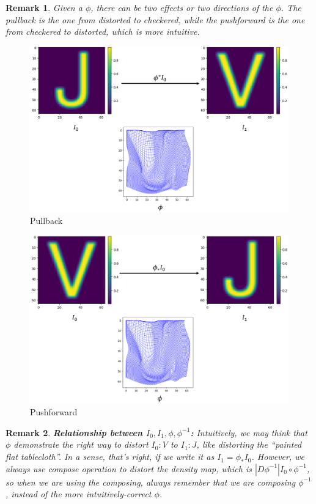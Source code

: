 \documentclass[a4paper]{article}
\theoremstyle{definition}
\theoremstyle{plain}
\newtheorem{remark}{Remark}
\begin{document}
\begin{remark}
Given a $\phi$, there can be two effects or two directions of the $\phi$. The pullback is the one from distorted to checkered, while the pushforward is the one from checkered to distorted, which is more intuitive.
\end{remark}

\begin{figure}[H]
\centering
\includegraphics[scale=0.15]{figure/pullbackphi.png}
\caption{Pullback}
\end{figure}

\begin{figure}[H]
\centering
\includegraphics[scale=0.15]{figure/pushforwardphi.png}
\caption{Pushforward}
\end{figure}

\begin{remark}
\textbf{Relationship between $I_0, I_1, \phi, \phi^{-1}$:}
Intuitively, we may think that $\phi$ demonstrate the right way to distort $I_0:V$ to $I_1:J$, like distorting the ``painted flat tablecloth''. In a sense, that's right, if we write it as $I_1=\phi_*I_0$. However, we always use compose operation to distort the density map, which is $|D\phi^{-1}|I_0\circ\phi^{-1}$, so when we are using the composing, always remember that we are composing $\phi^{-1}$, instead of the more intuitively-correct $\phi$.
\end{remark}
\end{document}
